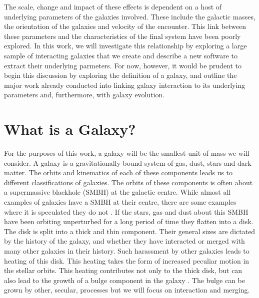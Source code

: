 The scale, change and impact of these effects is dependent on a host of underlying parameters of the galaxies involved. These include the galactic masses, the orientation of the galaxies and velocity of the encounter. This link between these parameters and the characteristics of the final system have been poorly explored. In this work, we will investigate this relationship by exploring a large sample of interacting galaxies that we create and describe a new software to extract their underlying parmeters. For now, however, it would be prudent to begin this discussion by exploring the definition of a galaxy, and outline the major work already conducted into linking galaxy interaction to its underlying parameters and, furthermore, with galaxy evolution.

\section{What is a Galaxy?}
\noindent For the purposes of this work, a galaxy will be the smallest unit of mass we will consider. A galaxy is a gravitationally bound system of gas, dust, stars and dark matter. The orbits and kinematics of each of these components leads us to different classifications of galaxies. The orbits of these components is often about a supermassive blackhole (SMBH) at the galactic centre. While almost all examples of galaxies have a SMBH at their centre, there are some examples where it is speculated they do not \citep{2001AJ....122.2469G}. If the stars, gas and dust about this SMBH have been orbiting unperturbed for a long period of time they flatten into a disk. The disk is split into a thick and thin component. Their general sizes are dictated by the history of the galaxy, and whether they have interacted or merged with many other galaxies in their history. Such harassment by other galaxies leads to heating of this disk. This heating takes the form of increased peculiar motion in the stellar orbits. This heating contributes not only to the thick disk, but can also lead to the growth of a bulge component in the galaxy \citep{2010ApJ...715..202H, 2017ApJ...837L...8B}. The bulge can be grown by other, secular, processes but we will focus on interaction and merging.

